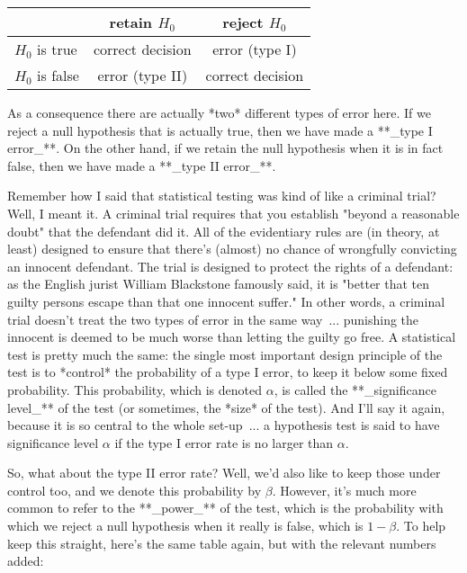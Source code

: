 \begin{center}
\begin{tabular}{l|cc}
 & retain $H_0$ & reject $H_0$ \\ \hline
 $H_0$ is true & correct decision & error (type I) \\
 $H_0$ is false & error (type II) & correct decision \\
\end{tabular} 
\end{center}


As a consequence there are actually *two* different types of error here. If we reject a null hypothesis that is actually true, then we have made a **_type I error_**. On the other hand, if we retain the null hypothesis when it is in fact false, then we have made a **_type II error_**. 

Remember how I said that statistical testing was kind of like a criminal trial? Well, I meant it. A criminal trial requires that you establish "beyond a reasonable doubt" that the defendant did it. All of the evidentiary rules are (in theory, at least) designed to ensure that there's (almost) no chance of wrongfully convicting an innocent defendant. The trial is designed to protect the rights of a defendant: as the English jurist William Blackstone famously said, it is "better that ten guilty persons escape than that one innocent suffer." In other words, a criminal trial doesn't treat the two types of error in the same way~... punishing the innocent is deemed to be much worse than letting the guilty go free. A statistical test is pretty much the same: the single most important design principle of the test is to *control* the probability of a type I error, to keep it below some fixed probability. This probability, which is denoted $\alpha$, is called the **_significance level_** of the test (or sometimes, the *size* of the test). And I'll say it again, because it is so central to the whole set-up~... a hypothesis test is said to have significance level $\alpha$ if the type I error rate is no larger than $\alpha$. 

So, what about the type II error rate? Well, we'd also like to keep those under control too, and we denote this probability by $\beta$. However, it's much more common to refer to the  **_power_** of the test, which is the probability with which we reject a null hypothesis when it really is false, which is $1-\beta$. To help keep this straight, here's the same table again, but with the relevant numbers added:

